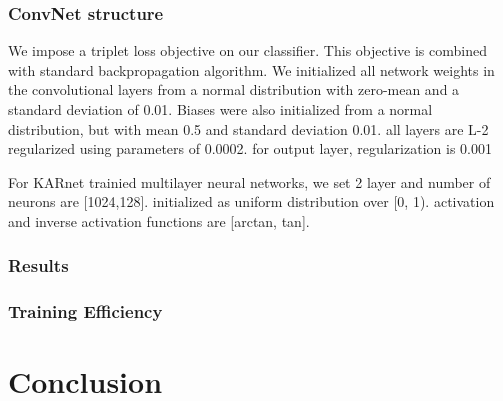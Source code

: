 \documentclass[runningheads]{llncs}
\begin{document}
\subsubsection{ConvNet structure}
 We impose a triplet loss objective on our classifier.
This objective is combined with standard backpropagation algorithm.
 We initialized all network weights in the convolutional layers from a normal distribution with zero-mean and a standard deviation of 0.01. Biases were also initialized from a normal distribution, but with mean 0.5 and standard deviation 0.01.
 all layers are L-2 regularized using parameters of 0.0002. for output layer, regularization is 0.001

 For KARnet trainied multilayer neural networks, we set 2 layer and number of neurons are [1024,128]. initialized as uniform distribution over [0, 1).
 activation and inverse activation functions are [arctan, tan].

\subsubsection{Results}
\subsubsection{Training Efficiency}

\section{Conclusion}

%
%
%
%
%
%






\end{document}
